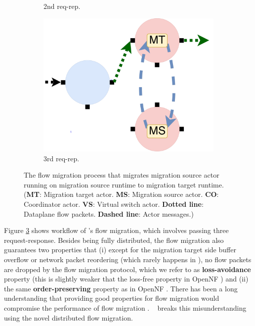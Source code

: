 \begin{figure}[!h]
\begin{subfigure}[t]{0.33\linewidth}
     \caption{2nd req-rep.}\label{fig:mig2}
    \end{subfigure}\hfill
  \begin{subfigure}[t]{0.33\linewidth}
 \centering
   \includegraphics[width=\columnwidth]{figure/nfactor-mig3.pdf}
   \caption{3rd req-rep.}\label{fig:mig3} \end{subfigure}\hfill
 \caption{The flow migration process that migrates migration source actor running on migration source runtime to migration target runtime. (\textbf{MT}: Migration target actor. \textbf{MS}: Migration source actor. \textbf{CO}: Coordinator actor. \textbf{VS}: Virtual switch actor. \textbf{Dotted line}: Dataplane flow packets. \textbf{Dashed line}: Actor messages.)}
\label{fig:mig}
\end{figure}

Figure \ref{fig:mig} shows workflow of \nfactor's flow migration, which involves passing three request-response. Besides being fully distributed, the flow migration also guarantees two properties that (i) except for the migration target side buffer overflow or network packet reordering (which rarely happens in \nfactor), no flow packets are dropped by the flow migration protocol, which we refer to as \textbf{loss-avoidance} property (this is slightly weaker that the loss-free property in OpenNF \cite{gember2015opennf}) and (ii) the same \textbf{order-preserving} property as in OpenNF \cite{gember2015opennf}. There has been a long understanding that providing good properties for flow migration would compromise the performance of flow migration \cite{gember2015opennf}. \nfactor~ breaks this misunderstanding using the novel distributed flow migration.

